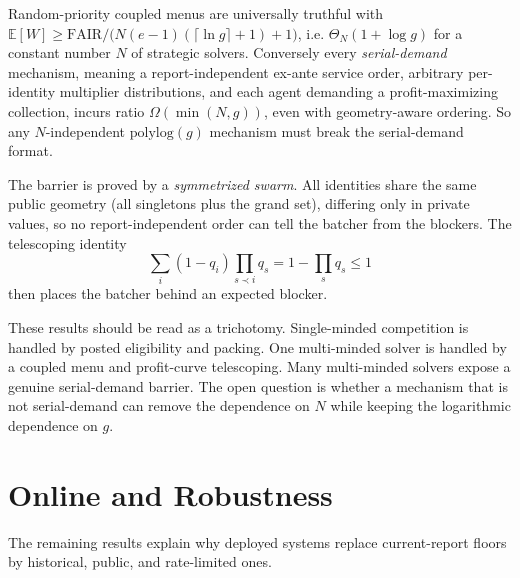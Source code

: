 \documentclass{llncs}
\newcommand{\FAIR}{\mathrm{FAIR}}
\newcommand{\E}{\mathbb{E}}
\begin{document}
\begin{theorem}\label{thm:multi}
Random-priority coupled menus are universally truthful with
$\E[W]\ge\FAIR/\big(N(e-1)(\lceil\ln g\rceil+1)+1\big)$, i.e.
$\Theta_N(1+\log g)$ for a constant number $N$ of strategic solvers.
Conversely every \emph{serial-demand} mechanism, meaning a report-independent
ex-ante service order, arbitrary per-identity multiplier distributions,
and each agent demanding a profit-maximizing collection, incurs ratio
$\Omega(\min(N,g))$, even with geometry-aware ordering. So any
$N$-independent $\mathrm{polylog}(g)$ mechanism must break the
serial-demand format.
\end{theorem}

The barrier is proved by a \emph{symmetrized swarm}. All identities share
the same public geometry (all singletons plus the grand set), differing
only in private values, so no report-independent order can tell the
batcher from the blockers. The telescoping identity
\[
  \sum_i(1-q_i)\prod_{s\prec i}q_s=1-\prod_s q_s\le1
\]
then places the batcher behind an expected blocker.

These results should be read as a trichotomy. Single-minded competition
is handled by posted eligibility and packing. One multi-minded solver is
handled by a coupled menu and profit-curve telescoping. Many
multi-minded solvers expose a genuine serial-demand barrier. The open
question is whether a mechanism that is not serial-demand can remove the
dependence on $N$ while keeping the logarithmic dependence on $g$.

\section{Online and Robustness}\label{sec:online}

The remaining results explain why deployed systems replace current-report
floors by historical, public, and rate-limited ones.
\end{document}
